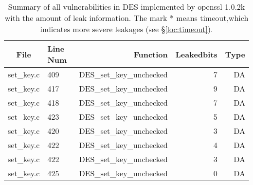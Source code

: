 \begin{table}%
\centering\tiny
\caption{Summary of all vulnerabilities in DES implemented by openssl 1.0.2k with the amount of leak information. The mark $*$ means timeout,which indicates more severe leakages (see \S\ref{loc:timeout}).}\label{tab:DESopenssl}
\begin{tabular}{clrrr}
\hline
\textbf{File} & \textbf{Line Num} & \textbf{Function} & \textbf{Leakedbits} & \textbf{Type} \\\hline
set\_key.c& 409&DES\_set\_key\_unchecked&7 &DA\\
set\_key.c& 417&DES\_set\_key\_unchecked&9 &DA\\
set\_key.c& 418&DES\_set\_key\_unchecked&7 &DA\\
set\_key.c& 423&DES\_set\_key\_unchecked&5 &DA\\
set\_key.c& 420&DES\_set\_key\_unchecked&3 &DA\\
set\_key.c& 422&DES\_set\_key\_unchecked&4 &DA\\
set\_key.c& 422&DES\_set\_key\_unchecked&3 &DA\\
set\_key.c& 425&DES\_set\_key\_unchecked&0 &DA\\
\hline
\end{tabular}
\end{table}